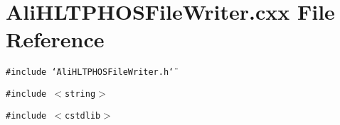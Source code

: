 \section{Ali\-HLTPHOSFile\-Writer.cxx File Reference}
\label{AliHLTPHOSFileWriter_8cxx}


{\tt \#include \char`\"{}Ali\-HLTPHOSFile\-Writer.h\char`\"{}}\par
{\tt \#include $<$string$>$}\par
{\tt \#include $<$cstdlib$>$}\par

